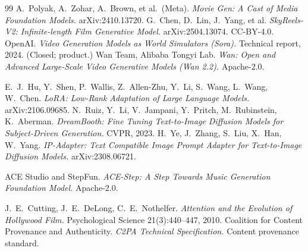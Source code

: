 \documentclass[11pt]{article}
\begin{document}
\begin{thebibliography}{99}
 A.\ Polyak, A.\ Zohar, A.\ Brown, et al.\ (Meta). \emph{Movie Gen: A Cast of Media Foundation
Models.} arXiv:2410.13720.
 G.\ Chen, D.\ Lin, J.\ Yang, et al. \emph{SkyReels-V2: Infinite-length Film Generative
Model.} arXiv:2504.13074. CC-BY-4.0.
 OpenAI. \emph{Video Generation Models as World Simulators (Sora).} Technical report, 2024.
(Closed; product.)
 Wan Team, Alibaba Tongyi Lab. \emph{Wan: Open and Advanced Large-Scale Video Generative Models
(Wan 2.2).} Apache-2.0.

 E.\ J.\ Hu, Y.\ Shen, P.\ Wallis, Z.\ Allen-Zhu, Y.\ Li, S.\ Wang, L.\ Wang, W.\ Chen.
\emph{LoRA: Low-Rank Adaptation of Large Language Models.} arXiv:2106.09685.
 N.\ Ruiz, Y.\ Li, V.\ Jampani, Y.\ Pritch, M.\ Rubinstein, K.\ Aberman. \emph{DreamBooth:
Fine Tuning Text-to-Image Diffusion Models for Subject-Driven Generation.} CVPR, 2023.
 H.\ Ye, J.\ Zhang, S.\ Liu, X.\ Han, W.\ Yang. \emph{IP-Adapter: Text Compatible Image
Prompt Adapter for Text-to-Image Diffusion Models.} arXiv:2308.06721.

 ACE Studio and StepFun. \emph{ACE-Step: A Step Towards Music Generation Foundation Model.}
Apache-2.0.

 J.\ E.\ Cutting, J.\ E.\ DeLong, C.\ E.\ Nothelfer. \emph{Attention and the Evolution of
Hollywood Film.} Psychological Science 21(3):440--447, 2010.
 Coalition for Content Provenance and Authenticity. \emph{C2PA Technical Specification.} Content
provenance standard.

\end{thebibliography}
\end{document}

